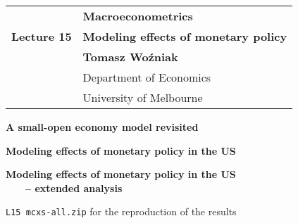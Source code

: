 \documentclass[notes,blackandwhite,mathsans,usenames,dvipsnames]{beamer}
\begin{document}






{
\begin{frame}

\vspace{1cm}
\begin{tabular}{rl}
&\textbf{\LARGE\color{mcxs2} Macroeconometrics}\\[8ex]
\textbf{\Large\color{purple} Lecture 15}&\textbf{\Large\color{mcxs2}Modeling effects of monetary policy}\\[16ex]
&\textbf{\color{purple}Tomasz Wo\'zniak}\\[1ex]
&{\small\color{mcxs3} Department of Economics}\\
&{\small\color{mcxs3}University of Melbourne}
\end{tabular}

\end{frame}
}




{
\begin{frame}

\vspace{1cm}\textbf{\color{mcxs2}A small-open economy model revisited}

\bigskip\textbf{\color{purple}Modeling effects of monetary policy in the US}

\bigskip\textbf{\color{mcxs2}Modeling effects of monetary policy in the US\\ $\qquad$-- extended analysis}


%


%


{}

 \texttt{\color{purple}L15 mcxs-all.zip} {\color{mcxs2}for the reproduction of the results}

\end{frame}
}
\end{document}
